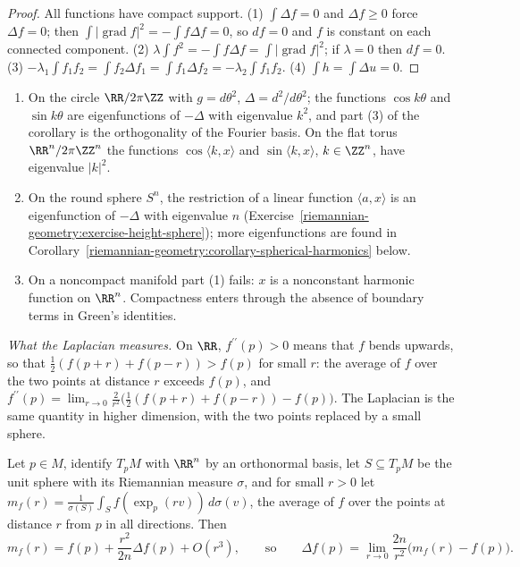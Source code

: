 \begin{proof}
All functions have compact support. (1) $\int\Delta f = 0$ and $\Delta f \geq 0$ force $\Delta f = 0$; then $\int|\operatorname{grad}f|^2 = -\int f\Delta f = 0$, so $df = 0$ and $f$ is constant
on each connected component. (2) $\lambda\int f^2 = -\int f\Delta f = \int|\operatorname{grad}f|^2$; if $\lambda = 0$ then $df = 0$. (3) $-\lambda_1\int f_1f_2 = \int f_2\Delta f_1 =
\int f_1\Delta f_2 = -\lambda_2\int f_1f_2$. (4) $\int h = \int\Delta u = 0$.
\end{proof}

\begin{example}\label{riemannian-geometry:example-laplacian-eigen}
\begin{enumerate}
\item On the circle $\RR/2\pi\ZZ$ with $g = d\theta^2$, $\Delta = d^2/d\theta^2$; the functions $\cos k\theta$ and $\sin k\theta$ are eigenfunctions of $-\Delta$ with eigenvalue $k^2$, and part (3)
of the corollary is the orthogonality of the Fourier basis. On the flat torus $\RR^n/2\pi\ZZ^n$ the functions $\cos\langle k, x\rangle$ and $\sin\langle k, x\rangle$, $k \in \ZZ^n$, have eigenvalue $|k|^2$.
\item On the round sphere $S^n$, the restriction of a linear function $\langle a, x\rangle$ is an eigenfunction of $-\Delta$ with eigenvalue $n$
(Exercise~\ref{riemannian-geometry:exercise-height-sphere}); more eigenfunctions are found in Corollary~\ref{riemannian-geometry:corollary-spherical-harmonics} below.
\item On a noncompact manifold part (1) fails: $x$ is a nonconstant harmonic function on $\RR^n$. Compactness enters through the absence of boundary terms in Green's identities.
\end{enumerate}
\end{example}

\emph{What the Laplacian measures.} On $\RR$, $f^{\prime\prime}(p) > 0$ means that $f$ bends upwards, so that $\frac12(f(p + r) + f(p - r)) > f(p)$ for small $r$: the average of $f$ over the
two points at distance $r$ exceeds $f(p)$, and $f^{\prime\prime}(p) = \lim_{r\to0}\frac{2}{r^2}\bigl(\frac12(f(p + r) + f(p - r)) - f(p)\bigr)$. The Laplacian is the same quantity in higher
dimension, with the two points replaced by a small sphere.

\begin{proposition}\label{riemannian-geometry:proposition-laplacian-mean}
Let $p \in M$, identify $T_pM$ with $\RR^n$ by an orthonormal basis, let $S \subseteq T_pM$ be the unit sphere with its Riemannian measure $\sigma$, and for small $r > 0$ let
$m_f(r) = \frac{1}{\sigma(S)}\int_Sf(\exp_p(rv))\,d\sigma(v)$, the average of $f$ over the points at distance $r$ from $p$ in all directions. Then
\[
m_f(r) = f(p) + \frac{r^2}{2n}\Delta f(p) + O(r^3), \qquad\text{so}\qquad \Delta f(p) = \lim_{r\to0}\frac{2n}{r^2}\bigl(m_f(r) - f(p)\bigr).
\]
\end{proposition}

